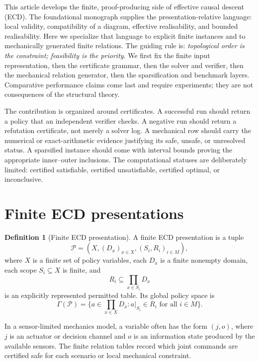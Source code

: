 \documentclass[11pt]{article}
\theoremstyle{plain}
\theoremstyle{definition}
\newtheorem{definition}[theorem]{Definition}
\theoremstyle{remark}
\begin{document}
This article develops the finite, proof-producing side of effective causal
descent (ECD).  The foundational monograph supplies the presentation-relative
language: local validity, compatibility of a diagram, effective realisability,
and bounded realisability.  Here we specialize that language to explicit finite
instances and to mechanically generated finite relations.  The guiding rule is:
\emph{topological order is the constraint; feasibility is the priority}.  We
first fix the finite input representation, then the certificate grammar, then
the solver and verifier, then the mechanical relation generator, then the
sparsification and benchmark layers.  Comparative performance claims come last
and require experiments; they are not consequences of the structural theory.

The contribution is organized around certificates.  A successful run should
return a policy that an independent verifier checks.  A negative run should
return a refutation certificate, not merely a solver log.  A mechanical row
should carry the numerical or exact-arithmetic evidence justifying its safe,
unsafe, or unresolved status.  A sparsified instance should come with interval
bounds proving the appropriate inner--outer inclusions.  The computational
statuses are deliberately limited: certified satisfiable, certified
unsatisfiable, certified optimal, or inconclusive.

\section{Finite ECD presentations}
\label{sec:finite-presentations}

\begin{definition}[Finite ECD presentation]
A finite ECD presentation is a tuple
\[
  \mathcal P=(X,(D_x)_{x\in X},(S_i,R_i)_{i\in M}),
\]
where \(X\) is a finite set of policy variables, each \(D_x\) is a finite
nonempty domain, each scope \(S_i\subseteq X\) is finite, and
\[
  R_i\subseteq\prod_{x\in S_i}D_x
\]
is an explicitly represented permitted table.  Its global policy space is
\[
  \Gamma(\mathcal P)=
  \{a\in\prod_{x\in X}D_x: a|_{S_i}\in R_i\text{ for all }i\in M\}.
\]
\end{definition}

In a sensor-limited mechanics model, a variable often has the form \((j,o)\),
where \(j\) is an actuator or decision channel and \(o\) is an information state
produced by the available sensors.  The finite relation tables record which
joint commands are certified safe for each scenario or local mechanical
constraint.
\end{document}
